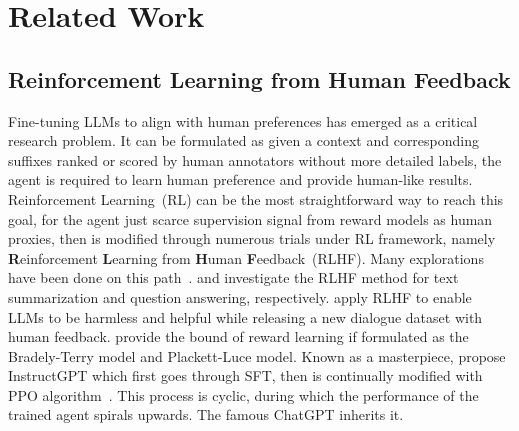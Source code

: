 \section{Related Work}
\subsection{Reinforcement Learning from Human Feedback} Fine-tuning LLMs to align with human preferences has emerged as a critical research problem. It can be formulated as given a context and corresponding suffixes ranked or scored by human annotators without more detailed labels, the agent is required to learn human preference and provide human-like results. Reinforcement Learning~(RL) can be the most straightforward way to reach this goal, for the agent just scarce supervision signal from reward models as human proxies, then is modified through numerous trials under RL framework, namely \textbf{R}einforcement \textbf{L}earning from \textbf{H}uman \textbf{F}eedback~(RLHF).
Many explorations have been done on this path~\cite{NIPS2017_d5e2c0ad, pmlr-v70-macglashan17a, Warnell_Waytowich_Lawhern_Stone_2018, ziegler2019fine, stiennon2020learning, nakano2021webgpt, lee2021pebble, 10.1145/3477495.3532001, snell2022offline, bai2022training, ouyang2022training, zhu2023principled, zhu2023fine}. 
\citet{stiennon2020learning} and \citet{nakano2021webgpt} investigate the RLHF method for text summarization and question answering, respectively. 
\citet{bai2022training} apply RLHF to enable LLMs to be harmless and helpful while releasing a new dialogue dataset with human feedback. 
\citet{zhu2023principled} provide the bound of reward learning if formulated as the Bradely-Terry model and Plackett-Luce model. Known as a masterpiece, \citet{ouyang2022training} propose InstructGPT which first goes through SFT, then is continually modified with PPO algorithm~\cite{schulman2017proximal}. This process is cyclic, during which the performance of the trained agent spirals upwards. The famous ChatGPT inherits it.

